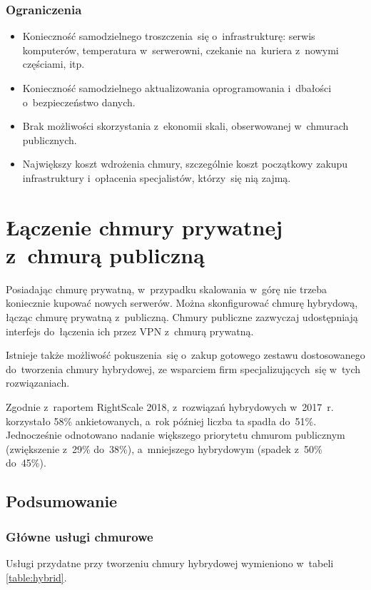 \documentclass[12pt,a4paper,twoside,titlepage,openright]{book}
\begin{document}
\subsubsection{Ograniczenia}
\begin{itemize}
\item Konieczność samodzielnego troszczenia~się o~infrastrukturę: serwis komputerów, temperatura w~serwerowni, czekanie na~kuriera z~nowymi częściami, itp.
\item Konieczność samodzielnego aktualizowania oprogramowania i~dbałości o~bezpieczeństwo danych.
\item Brak możliwości skorzystania z~ekonomii skali, obserwowanej w~chmurach publicznych.
\item Największy koszt wdrożenia chmury, szczególnie koszt początkowy zakupu infrastruktury i~opłacenia specjalistów, którzy~się nią zajmą.
\end{itemize}

\section{Łączenie chmury prywatnej z~chmurą publiczną}

Posiadając chmurę prywatną, w~przypadku skalowania w~górę nie trzeba koniecznie kupować nowych serwerów. Można skonfigurować chmurę hybrydową, łącząc chmurę prywatną z~publiczną. Chmury publiczne zazwyczaj udostępniają interfejs do~łączenia ich przez VPN z~chmurą prywatną.

Istnieje także możliwość pokuszenia~się o~zakup gotowego zestawu dostosowanego do~tworzenia chmury hybrydowej, ze wsparciem firm specjalizujących~się w~tych rozwiązaniach.

Zgodnie z~raportem RightScale 2018\cite{rightscaleReport}, z~rozwiązań hybrydowych w~2017~r. korzystało 58\% ankietowanych, a~rok później liczba ta spadła do~51\%. Jednocześnie odnotowano nadanie większego priorytetu chmurom publicznym (zwiększenie z~29\% do~38\%), a~mniejszego hybrydowym (spadek z~50\% do~45\%).


\subsection*{Podsumowanie}



\subsubsection*{Główne usługi chmurowe}
Usługi przydatne przy tworzeniu chmury hybrydowej wymieniono w~tabeli \ref{table:hybrid}.
\end{document}
